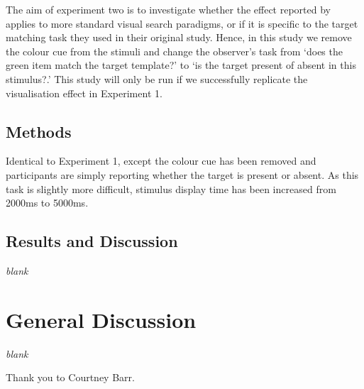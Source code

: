 \documentclass[smallextended]{svjour3}       %
\begin{document}
The aim of experiment two is to investigate whether the effect reported by \cite{reinhart2015} applies to more standard visual search paradigms, or if it is specific to the target matching task they used in their original study. Hence, in this study we remove the colour cue from the stimuli and change the observer's task from `does the green item match the target template?' to `is the target present of absent in this stimulus?.' This study will only be run if we successfully replicate the visualisation effect in Experiment 1. 

\subsection{Methods}

Identical to Experiment 1, except the colour cue has been removed and participants are simply reporting whether the target is present or absent. As this task is slightly more difficult, stimulus display time has been increased from 2000ms to 5000ms. 

\subsection{Results and Discussion}


\centering
\textit{blank}

\section{General Discussion}
\label{sec:discussion}

\centering
\textit{blank}

\begin{acknowledgements}
Thank you to Courtney Barr. 
\end{acknowledgements}




\end{document}
